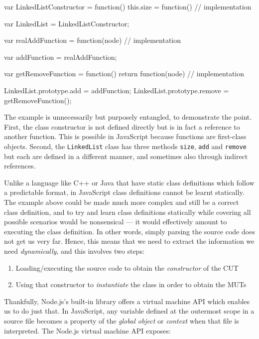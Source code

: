 \begin{verbcode}

var LinkedListConstructor = function() {
    this.size = function() {
        // implementation
    }
}

var LinkedList = LinkedListConstructor;

var realAddFunction = function(node) {
    // implementation
}

var addFunction = realAddFunction;

var getRemoveFunction = function() {
    return function(node) {
        // implementation
    }
}

LinkedList.prototype.add = addFunction;
LinkedList.prototype.remove = getRemoveFunction();
\end{verbcode}

The example is unnecessarily but purposely entangled, to demonstrate the point. First, the class constructor is not defined directly but is in fact a reference to another function. This is possible in JavaScript because functions are first-class objects. Second, the \texttt{LinkedList} class has three methods \texttt{size}, \texttt{add} and \texttt{remove} but each are defined in a different manner, and sometimes also through indirect references.

Unlike a language like C++ or Java that have static class definitions which follow a predictable format, in JavaScript class definitions cannot be learnt statically. The example above could be made much more complex and still be a correct class definition, and to try and learn class definitions statically while covering all possible scenarios would be nonsensical --- it would effectively amount to executing the class definition. In other words, simply parsing the source code does not get us very far. Hence, this means that we need to extract the information we need \emph{dynamically}, and this involves two steps:

\begin{enumerate}
   \item Loading/executing the source code to obtain the \emph{constructor} of the CUT
   \item Using that constructor to \emph{instantiate} the class in order to obtain the MUTs
\end{enumerate}

Thankfully, Node.js's built-in library offers a virtual machine API which enables us to do just that. In JavaScript, any variable defined at the outermost scope in a source file becomes a property of the \emph{global object} or \emph{context} when that file is interpreted. The Node.js virtual machine API exposes:\\

